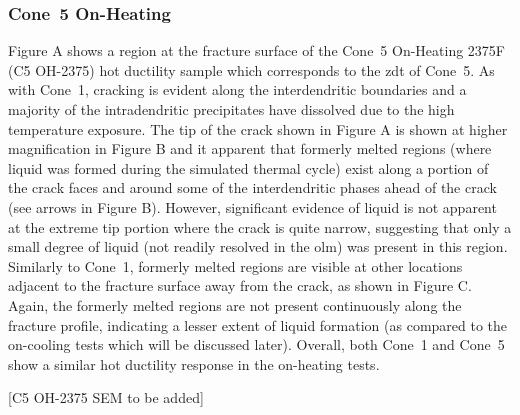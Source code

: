 \subsubsection{Cone~5 On-Heating}
Figure A shows a region at the fracture surface of the Cone~5 On-Heating 2375F (C5 OH-2375) hot ductility sample which corresponds to the \gls{zdt} of Cone~5. As with Cone~1, cracking is evident along the interdendritic boundaries and a majority of the intradendritic precipitates have dissolved due to the high temperature exposure. The tip of the crack shown in Figure A is shown at higher magnification in Figure B and it apparent that formerly melted regions (where liquid was formed during the simulated thermal cycle) exist along a portion of the crack faces and around some of the interdendritic phases ahead of the crack (see arrows in Figure B). However, significant evidence of liquid is not apparent at the extreme tip portion where the crack is quite narrow, suggesting that only a small degree of liquid (not readily resolved in the \gls{olm}) was present in this region. Similarly to Cone~1, formerly melted regions are visible at other locations adjacent to the fracture surface away from the crack, as shown in Figure C. Again, the formerly melted regions are not present continuously along the fracture profile, indicating a lesser extent of liquid formation (as compared to the on-cooling tests which will be discussed later). Overall, both Cone~1 and Cone~5 show a similar hot ductility response in the on-heating tests.

[C5 OH-2375 SEM to be added]






